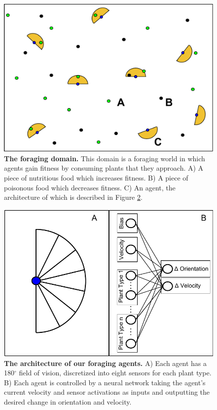 \documentclass{sig-alternate}
\begin{document}
\begin{figure}[t]
  \centering
    \includegraphics[scale=.333]{world.pdf}
  \caption{\textbf{The foraging domain.} This domain is a foraging world in which agents gain fitness by consuming plants that they approach.  A) A piece of nutritious food which increases fitness. B) A piece of poisonous food which decreases fitness. C) An agent, the architecture of which is described in Figure \ref{fig:agent-architecture}.}
  \label{fig:foraging-world}
\end{figure}
\begin{figure}[t]
  \centering
    \includegraphics[scale=.665]{foraging_agent_architecture.pdf}  \caption{\textbf{The architecture of our foraging agents.} A) Each agent has a 180$^{\circ}$ field of vision, discretized into eight sensors for each plant type. B) Each agent is controlled by a neural network taking the agent's current velocity and sensor activations as inputs and outputting the desired change in orientation and velocity.}
  \label{fig:agent-architecture}
\end{figure}
\end{document}
